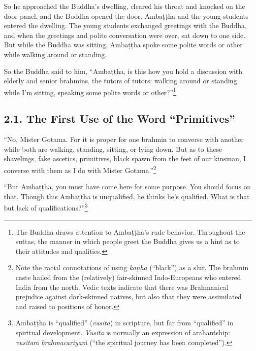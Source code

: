 \documentclass[12pt,openany]{book}%
\begin{document}
So he approached the Buddha’s dwelling, cleared his throat and knocked on the door-panel, and the Buddha opened the door. \textsanskrit{Ambaṭṭha} and the young students entered the dwelling. The young students exchanged greetings with the Buddha, and when the greetings and polite conversation were over, sat down to one side. But while the Buddha was sitting, \textsanskrit{Ambaṭṭha} spoke some polite words or other while walking around or standing. 

So the Buddha said to him, “\textsanskrit{Ambaṭṭha}, is this how you hold a discussion with elderly and senior brahmins, the tutors of tutors: walking around or standing while I’m sitting, speaking some polite words or other?”\footnote{The Buddha draws attention to \textsanskrit{Ambaṭṭha}’s rude behavior. Throughout the suttas, the manner in which people greet the Buddha gives us a hint as to their attitudes and qualities. } 

\subsection*{2.1. The First Use of the Word “Primitives” }

“No, Mister Gotama. For it is proper for one brahmin to converse with another while both are walking, standing, sitting, or lying down. But as to these shavelings, fake ascetics, primitives, black spawn from the feet of our kinsman, I converse with them as I do with Mister Gotama.”\footnote{Note the racial connotations of using \textit{\textsanskrit{kaṇha}} (“black”) as a slur. The brahmin caste hailed from the (relatively) fair-skinned Indo-Europeans who entered India from the north. Vedic texts indicate that there was Brahmanical prejudice against dark-skinned natives, but also that they were assimilated and raised to positions of honor. } 

“But \textsanskrit{Ambaṭṭha}, you must have come here for some purpose. You should focus on that. Though this \textsanskrit{Ambaṭṭha} is unqualified, he thinks he’s qualified. What is that but lack of qualifications?”\footnote{\textsanskrit{Ambaṭṭha} is “qualified” (\textit{vusita}) in scripture, but far from “qualified” in spiritual development. \textit{Vusita} is normally an expression of arahantship: \textit{\textsanskrit{vusitaṁ} \textsanskrit{brahmacariyaṁ}} (“the spiritual journey has been completed”). } 
\end{document}
